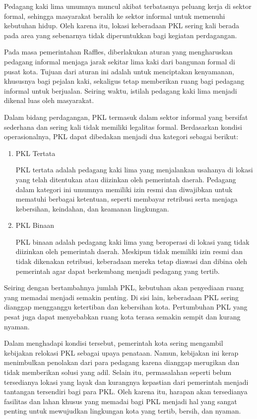 \documentclass[../rumukota.tex]{subfiles}
\begin{document}
Pedagang kaki lima umumnya muncul akibat terbatasnya peluang kerja di sektor formal, sehingga masyarakat beralih ke sektor informal untuk memenuhi kebutuhan hidup. Oleh karena itu, lokasi keberadaan PKL sering kali berada pada area yang sebenarnya tidak diperuntukkan bagi kegiatan perdagangan.

Pada masa pemerintahan Raffles, diberlakukan aturan yang mengharuskan pedagang informal menjaga jarak sekitar lima kaki dari bangunan formal di pusat kota. Tujuan dari aturan ini adalah untuk menciptakan kenyamanan, khususnya bagi pejalan kaki, sekaligus tetap memberikan ruang bagi pedagang informal untuk berjualan. Seiring waktu, istilah pedagang kaki lima menjadi dikenal luas oleh masyarakat.

Dalam bidang perdagangan, PKL termasuk dalam sektor informal yang bersifat sederhana dan sering kali tidak memiliki legalitas formal. Berdasarkan kondisi operasionalnya, PKL dapat dibedakan menjadi dua kategori sebagai berikut:
\begin{enumerate}
	\item PKL Tertata

	      PKL tertata adalah pedagang kaki lima yang menjalankan usahanya di lokasi yang telah ditentukan atau diizinkan oleh pemerintah daerah. Pedagang dalam kategori ini umumnya memiliki izin resmi dan diwajibkan untuk mematuhi berbagai ketentuan, seperti membayar retribusi serta menjaga kebersihan, keindahan, dan keamanan lingkungan.

	\item PKL Binaan

	      PKL binaan adalah pedagang kaki lima yang beroperasi di lokasi yang tidak diizinkan oleh pemerintah daerah. Meskipun tidak memiliki izin resmi dan tidak dikenakan retribusi, keberadaan mereka tetap diawasi dan dibina oleh pemerintah agar dapat berkembang menjadi pedagang yang tertib.
\end{enumerate}

Seiring dengan bertambahnya jumlah PKL, kebutuhan akan penyediaan ruang yang memadai menjadi semakin penting. Di sisi lain, keberadaan PKL sering dianggap mengganggu ketertiban dan kebersihan kota. Pertumbuhan PKL yang pesat juga dapat menyebabkan ruang kota terasa semakin sempit dan kurang nyaman.

Dalam menghadapi kondisi tersebut, pemerintah kota sering mengambil kebijakan relokasi PKL sebagai upaya penataan. Namun, kebijakan ini kerap menimbulkan penolakan dari para pedagang karena dianggap merugikan dan tidak memberikan solusi yang adil. Selain itu, permasalahan seperti belum tersedianya lokasi yang layak dan kurangnya kepastian dari pemerintah menjadi tantangan tersendiri bagi para PKL. Oleh karena itu, harapan akan tersedianya fasilitas dan lahan khusus yang memadai bagi PKL menjadi hal yang sangat penting untuk mewujudkan lingkungan kota yang tertib, bersih, dan nyaman.











\end{document}
